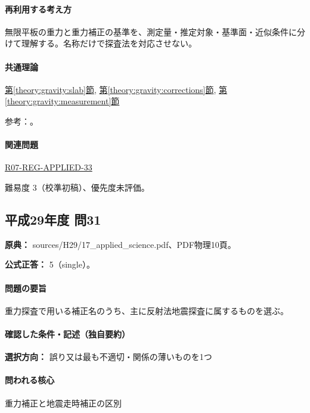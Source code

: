 \paragraph{再利用する考え方} 無限平板の重力と重力補正の基準を、測定量・推定対象・基準面・近似条件に分けて理解する。名称だけで探査法を対応させない。

\paragraph{共通理論} \hyperref[theory:gravity:slab]{第\ref*{theory:gravity:slab}節}, \hyperref[theory:gravity:corrections]{第\ref*{theory:gravity:corrections}節}, \hyperref[theory:gravity:measurement]{第\ref*{theory:gravity:measurement}節}

\par 参考：\cite{gsi_gravity_definitions}。

\paragraph{関連問題} \hyperref[q:r07-reg-applied-33]{R07-REG-APPLIED-33}

\par 難易度 3（校準初稿）、優先度未評価。

\subsection{平成29年度 問31}
\label{q:h29-reg-applied-31}

\noindent\textbf{原典：} sources/H29/17\_applied\_science.pdf、PDF物理10頁。

\textbf{公式正答：} 5（single）。

\paragraph{問題の要旨} 重力探査で用いる補正名のうち、主に反射法地震探査に属するものを選ぶ。

\paragraph{確認した条件・記述（独自要約）}\mbox{}\par

\noindent\textbf{選択方向：} 誤り又は最も不適切・関係の薄いものを1つ\par

\paragraph{問われる核心} 重力補正と地震走時補正の区別

